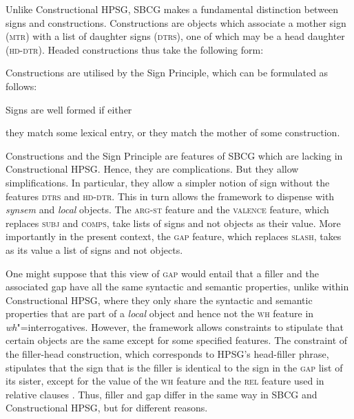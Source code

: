 \documentclass[output=paper
,notxmath 
	        ,collection
	        ,collectionchapter
 	        ,biblatex
                ,babelshorthands
                ,newtxmath
                ,draftmode
                ,colorlinks, citecolor=brown
]{langscibook}
\begin{document}
\begin{sloppypar}
Unlike Constructional HPSG, SBCG makes a fundamental distinction
between signs and constructions. Constructions are objects which
associate a mother sign (\textsc{mtr}) with a list of daughter signs
(\textsc{dtrs}), one of which may be a head daughter
(\textsc{hd-dtr}). Headed constructions thus take the following form:
\end{sloppypar}

\begin{exe}
  \ex \label{ex:UDC:SBCG:cx}

\end{exe}
\noindent
Constructions are utilised by the Sign Principle, which can be
formulated as follows:

\begin{exe}
  \ex \label{ex:UDC:SBCG:SignPrinciple} Signs are well formed if either

  \begin{xlist}
    \ex they match some lexical entry, or \ex they match the mother of
    some construction.
  \end{xlist}
\end{exe}

\noindent
Constructions and the Sign Principle are features of SBCG which
are lacking in Constructional HPSG. Hence, they are
complications. But they allow simplifications. In particular, they
allow a simpler notion of sign without the features \textsc{dtrs} and
\textsc{hd-dtr}. This in turn allows the framework to dispense with
\textit{synsem} and \textit{local} objects. The \textsc{arg-st}
feature and the \textsc{valence} feature, which replaces \textsc{subj}
and \textsc{comps}, take lists of signs and not  objects as
their value. More importantly in the present context, the \textsc{gap}
feature, which replaces \textsc{slash}, takes as its value a list of
signs and not  objects.

One might suppose that this view of \textsc{gap} would entail that a
filler and the associated gap have all the same syntactic and semantic
properties, unlike within Constructional HPSG, where they only
share the syntactic and semantic properties that are part of a
\textit{local} object and hence not the \textsc{wh} feature in
\emph{wh}"=interrogatives. However, the framework allows constraints
to stipulate that certain objects are the same except for some
specified features. The constraint of the filler-head construction,
which corresponds to HPSG’s head-filler phrase, stipulates that the
sign that is the filler is identical to the sign in the \textsc{gap}
list of its sister, except for the value of the \textsc{wh} feature
and the \textsc{rel} feature used in relative clauses \citep[]{Sag:12}. Thus, filler
and gap differ in the same way in SBCG and Constructional HPSG,
but for different reasons.
\end{document}
